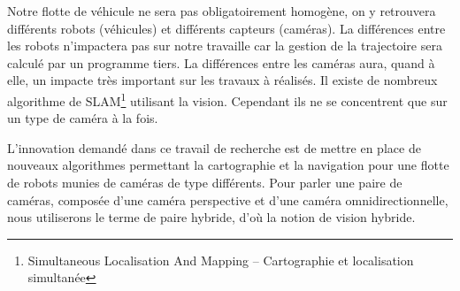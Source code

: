
Notre flotte de véhicule ne sera pas obligatoirement homogène, on y retrouvera différents robots (véhicules) et différents capteurs (caméras).
La différences entre les robots n'impactera pas sur notre travaille car la gestion de la trajectoire sera calculé par un programme tiers.
La différences entre les caméras aura, quand à elle, un impacte très important sur les travaux à réalisés.
Il existe de nombreux algorithme de SLAM\footnote{Simultaneous Localisation And Mapping -- Cartographie et localisation simultanée} utilisant la vision.
Cependant ils ne se concentrent que sur un type de caméra à la fois.

L'innovation demandé dans ce travail de recherche est de mettre en place de nouveaux algorithmes permettant la cartographie et la navigation pour une flotte de robots munies de caméras de type différents.
Pour parler une paire de caméras, composée d'une caméra perspective et d'une caméra omnidirectionnelle, nous utiliserons le terme de paire hybride, d'où la notion de vision hybride.
